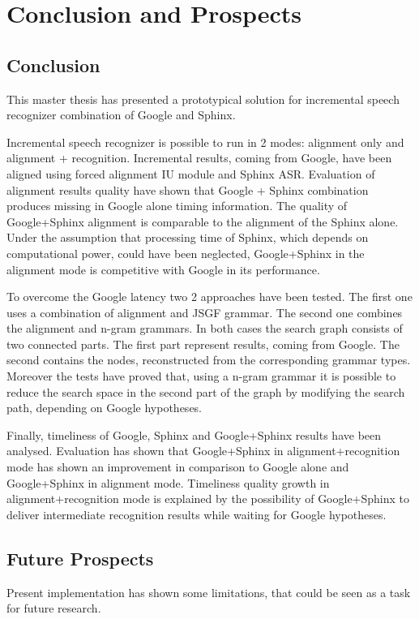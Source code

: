 \chapter{Conclusion and Prospects}

\label{chap:concl}
\section {Conclusion}
This master thesis has presented a prototypical solution for incremental speech
recognizer combination of Google and Sphinx. 
% 

Incremental speech recognizer is possible to run in 2 modes: alignment only and
alignment + recognition. Incremental results, coming from Google, have been
aligned using forced alignment IU module and Sphinx ASR. Evaluation of
alignment  results quality have shown that Google + Sphinx combination produces
missing in Google alone timing information. The quality of Google+Sphinx
alignment is comparable to the alignment of the Sphinx alone. Under the
assumption that processing time of Sphinx, which depends on computational power,
could have been neglected, Google+Sphinx in the alignment mode is competitive
with Google in its performance. 

To overcome the Google latency two 2 approaches have been tested.  The first one
uses a combination of alignment and JSGF grammar. The second one combines the
alignment and n-gram grammars.  In both cases the search graph consists of two
connected parts. The first part  represent results, coming from Google.
The second contains the nodes, reconstructed from the
corresponding grammar types. Moreover the tests have proved that, using a n-gram
grammar it is possible to reduce the search space in the second part of the
graph by modifying the search path, depending on Google hypotheses. 

Finally, timeliness of Google, Sphinx and Google+Sphinx results have been
analysed. Evaluation has shown that Google+Sphinx in alignment+recognition mode
has shown an improvement in comparison to Google alone and Google+Sphinx in
alignment mode. Timeliness quality growth in alignment+recognition mode is
explained by the possibility of Google+Sphinx to deliver intermediate
recognition results while waiting for Google hypotheses. 

\section {Future Prospects}
Present implementation has shown some limitations, that could be seen
as a task for future research.


